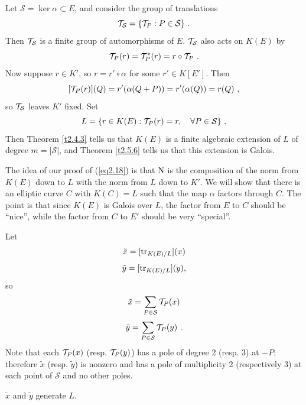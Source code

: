 Let $\mathcal{S} =\ker  \alpha \subset E$, and consider the group of translations
$$
\mathcal{T}_{\mathcal{S}}=\{\mathcal{T}_{P}:P\in \mathcal{S}\}\ .
$$
Then $\mathcal{T}_{\mathcal{S}}$ is a finite group of automorphisms of $E$. $\mathcal{T}_{\mathcal{S}}$ also acts on $K(E)$ by
$$
\mathcal{T}_{P}(r)=\mathcal{T}_{P}^{*}(r)=r\circ \mathcal{T}_{P}\ .
$$
Now suppose $r\in K'$, so $ r=r'\circ\alpha$ for some $r'\in K[E']$. Then
$$
[\transl{P}(r)](Q)=r'(\alpha(Q+P))=r'(\alpha(Q))=r(Q)\ ,
$$
so $\mathcal{T}_{\mathcal{S}}$ leaves $K'$ fixed. Set
$$
L=\{r\in K(E):\mathcal{T}_{P}(r)=r,\quad \forall P\in \mathcal{S}\}\ .
$$
Then Theorem \ref{t2.4.3} tells us that $K(E)$ is a finite algebraic extension of $L$ of degree $m=|\mathcal{S}|$, and Theorem \ref{t2.5.6} tells us that this extension is Galois.

The idea of our proof of (\ref{eq2.18}) is that $\operatorname{N}$ is the composition of the norm from $K(E)$ down to $L$ with the norm from $L$ down to $K'$. We will show that there is an elliptic curve $C$ with $K(C)=L$ such that the map $\alpha$ factors through $C$. The point is that since $K(E)$ is Galois over $L$, the factor from $E$ to $C$ should be ``nice'', while the factor from $C$ to $E'$ should be very ``special''.

%
Let
$$
\tilde{x}=[\operatorname{tr}_{K(E)/L}](x)
$$
$$
\tilde{y}=[\operatorname{tr}_{K(E)/L}](y),
$$
so
$$
\tilde{x}=\sum_{P\in \mathcal{S}}\mathcal{T}_{P}(x)
$$
$$
\tilde{y}=\sum_{P\in \mathcal{S}}\transl{P}(y)\ .
$$
Note that each $\mathcal{T}_{P}(x)$ (resp. $\mathcal{T}_{P}(y)$) has a pole of degree 2 (resp. 3) at $-P$; therefore $\tilde{x}$ (resp. $\tilde{y}$) is nonzero and has a pole of multiplicity 2 (respectively 3) at each point of $\mathcal{S}$ and no other poles.

\begin{prop}
\label{p2.6.11}
$\tilde{x}$ and $\tilde{y}$ generate $L$.
\end{prop}

